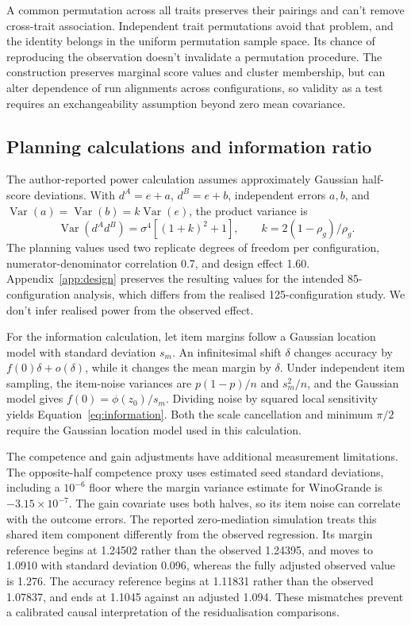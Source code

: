 A common permutation across all traits preserves their pairings and can't remove cross-trait association. Independent trait permutations avoid that problem, and the identity belongs in the uniform permutation sample space. Its chance of reproducing the observation doesn't invalidate a permutation procedure. The construction preserves marginal score values and cluster membership, but can alter dependence of run alignments across configurations, so validity as a test requires an exchangeability assumption beyond zero mean covariance.

\subsection{Planning calculations and information ratio}
The author-reported power calculation assumes approximately Gaussian half-score deviations. With $d^A=e+a$, $d^B=e+b$, independent errors $a,b$, and $\operatorname{Var}(a)=\operatorname{Var}(b)=k\operatorname{Var}(e)$, the product variance is
\begin{equation}
\operatorname{Var}(d^Ad^B)=\sigma^4[(1+k)^2+1],\qquad
k=2(1-\rho_g)/\rho_g.
\end{equation}
The planning values used two replicate degrees of freedom per configuration, numerator-denominator correlation 0.7, and design effect 1.60. Appendix~\ref{app:design} preserves the resulting values for the intended 85-configuration analysis, which differs from the realised 125-configuration study. We don't infer realised power from the observed effect.

For the information calculation, let item margins follow a Gaussian location model with standard deviation $s_m$. An infinitesimal shift $\delta$ changes accuracy by $f(0)\delta+o(\delta)$, while it changes the mean margin by $\delta$. Under independent item sampling, the item-noise variances are $p(1-p)/n$ and $s_m^2/n$, and the Gaussian model gives $f(0)=\phi(z_0)/s_m$. Dividing noise by squared local sensitivity yields Equation~\ref{eq:information}. Both the scale cancellation and minimum $\pi/2$ require the Gaussian location model used in this calculation.

The competence and gain adjustments have additional measurement limitations. The opposite-half competence proxy uses estimated seed standard deviations, including a $10^{-6}$ floor where the margin variance estimate for WinoGrande is $-3.15\times10^{-7}$. The gain covariate uses both halves, so its item noise can correlate with the outcome errors. The reported zero-mediation simulation treats this shared item component differently from the observed regression. Its margin reference begins at 1.24502 rather than the observed 1.24395, and moves to 1.0910 with standard deviation 0.096, whereas the fully adjusted observed value is 1.276. The accuracy reference begins at 1.11831 rather than the observed 1.07837, and ends at 1.1045 against an adjusted 1.094. These mismatches prevent a calibrated causal interpretation of the residualisation comparisons. 